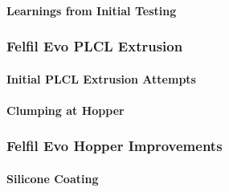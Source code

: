 \paragraph*{Learnings from Initial Testing\label{sec:methedology:extrusion:felfilSystem:felfilEvo:learningsFromInitialTesting}}

\subsubsection{Felfil Evo PLCL Extrusion\label{sec:methedology:extrusion:felfilSystem:felfilEvoPLCL}}

\paragraph*{Initial PLCL Extrusion Attempts\label{sec:methedology:extrusion:felfilSystem:felfilEvoPLCL:initialAttempts}}

\paragraph*{Clumping at Hopper\label{sec:methedology:extrusion:felfilSystem:felfilEvoPLCL:clumpingAtHopper}}

\subsubsection{Felfil Evo Hopper Improvements\label{sec:methedology:extrusion:felfilSystem:felfilEvoHopperImprovements}}

\paragraph*{Silicone Coating\label{sec:methedology:extrusion:felfilSystem:felfilEvoHopperImprovements:siliconeCoating}}

